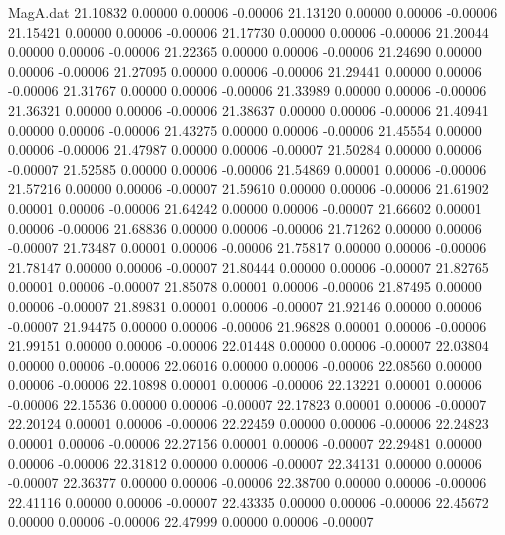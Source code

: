 \begin{filecontents}{MagA.dat}
  21.10832    0.00000    0.00006   -0.00006
  21.13120    0.00000    0.00006   -0.00006
  21.15421    0.00000    0.00006   -0.00006
  21.17730    0.00000    0.00006   -0.00006
  21.20044    0.00000    0.00006   -0.00006
  21.22365    0.00000    0.00006   -0.00006
  21.24690    0.00000    0.00006   -0.00006
  21.27095    0.00000    0.00006   -0.00006
  21.29441    0.00000    0.00006   -0.00006
  21.31767    0.00000    0.00006   -0.00006
  21.33989    0.00000    0.00006   -0.00006
  21.36321    0.00000    0.00006   -0.00006
  21.38637    0.00000    0.00006   -0.00006
  21.40941    0.00000    0.00006   -0.00006
  21.43275    0.00000    0.00006   -0.00006
  21.45554    0.00000    0.00006   -0.00006
  21.47987    0.00000    0.00006   -0.00007
  21.50284    0.00000    0.00006   -0.00007
  21.52585    0.00000    0.00006   -0.00006
  21.54869    0.00001    0.00006   -0.00006
  21.57216    0.00000    0.00006   -0.00007
  21.59610    0.00000    0.00006   -0.00006
  21.61902    0.00001    0.00006   -0.00006
  21.64242    0.00000    0.00006   -0.00007
  21.66602    0.00001    0.00006   -0.00006
  21.68836    0.00000    0.00006   -0.00006
  21.71262    0.00000    0.00006   -0.00007
  21.73487    0.00001    0.00006   -0.00006
  21.75817    0.00000    0.00006   -0.00006
  21.78147    0.00000    0.00006   -0.00007
  21.80444    0.00000    0.00006   -0.00007
  21.82765    0.00001    0.00006   -0.00007
  21.85078    0.00001    0.00006   -0.00006
  21.87495    0.00000    0.00006   -0.00007
  21.89831    0.00001    0.00006   -0.00007
  21.92146    0.00000    0.00006   -0.00007
  21.94475    0.00000    0.00006   -0.00006
  21.96828    0.00001    0.00006   -0.00006
  21.99151    0.00000    0.00006   -0.00006
  22.01448    0.00000    0.00006   -0.00007
  22.03804    0.00000    0.00006   -0.00006
  22.06016    0.00000    0.00006   -0.00006
  22.08560    0.00000    0.00006   -0.00006
  22.10898    0.00001    0.00006   -0.00006
  22.13221    0.00001    0.00006   -0.00006
  22.15536    0.00000    0.00006   -0.00007
  22.17823    0.00001    0.00006   -0.00007
  22.20124    0.00001    0.00006   -0.00006
  22.22459    0.00000    0.00006   -0.00006
  22.24823    0.00001    0.00006   -0.00006
  22.27156    0.00001    0.00006   -0.00007
  22.29481    0.00000    0.00006   -0.00006
  22.31812    0.00000    0.00006   -0.00007
  22.34131    0.00000    0.00006   -0.00007
  22.36377    0.00000    0.00006   -0.00006
  22.38700    0.00000    0.00006   -0.00006
  22.41116    0.00000    0.00006   -0.00007
  22.43335    0.00000    0.00006   -0.00006
  22.45672    0.00000    0.00006   -0.00006
  22.47999    0.00000    0.00006   -0.00007

\end{filecontents}
